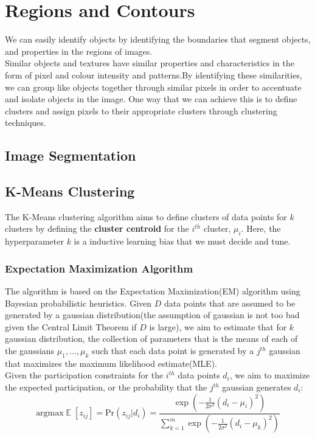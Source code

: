 \documentclass[12pt]{article}
\DeclareMathOperator{\E}{\mathbb{E}}
\begin{document}
\section{Regions and Contours}

We can easily identify objects by identifying the boundaries that segment objects, and properties in the regions of images. \\

Similar objects and textures have similar properties and characteristics in the form of pixel and colour intensity and patterns.By identifying these similarities, we can group like objects together through similar pixels in order to accentuate and isolate objects in the image. One way that we can achieve this is to define clusters and assign pixels to their appropriate clusters through clustering techniques.

\subsection{Image Segmentation}

\subsection{K-Means Clustering}

The K-Means clustering algorithm aims to define clusters of data points for $k$ clusters by defining the \textbf{cluster centroid} for the $i^{th}$ cluster, $\mu_i$. Here, the hyperparameter $k$ is a inductive learning bias that we must decide and tune.\\

\subsubsection{Expectation Maximization Algorithm}
The algorithm is based on the Expectation Maximization(EM) algorithm using Bayesian probabilistic heuristics. Given $D$ data points that are assumed to be generated by a gaussian distribution(the assumption of gaussian is not too bad given the Central Limit Theorem if $D$ is large), we aim to estimate that for $k$ gaussian distribution, the collection of parameters that is the means of each of the gaussians $\mu_1,..., \mu_k$ such that each data point is generated by a $j^{th}$ gaussian that maximizes the maximum likelihood estimate(MLE).\\

Given the participation constraints for the $i^{th}$ data points $d_i$, we aim to maximize the expected participation, or the probability that the $j^{th}$ gaussian generates $d_i$:
\begin{equation*}
\text{argmax} \E [z_{ij}] = \text{Pr} (z_{ij} | d_i) = \frac{\exp(-\frac{1}{2 \sigma^2} (d_i - \mu_i)^2)}{\sum_{k=1}^{m} \exp(-\frac{1}{2 \sigma^2} (d_i - \mu_k)^2)}
\end{equation*}
\end{document}
